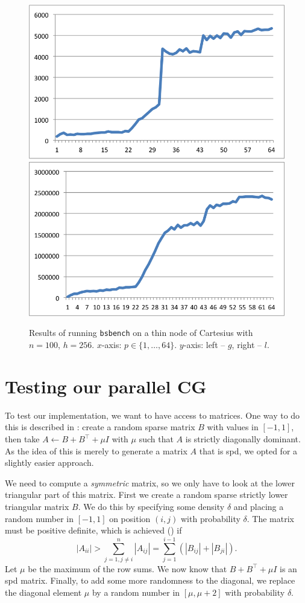 \documentclass[11pt]{amsart}
\theoremstyle{definition}
\begin{document}
\begin{figure}
  \includegraphics[width=0.49\linewidth]{cartg.png}
  \includegraphics[width=0.49\linewidth]{cartl.png}
  \caption{Results of running \texttt{bsbench} on a thin node of Cartesius with $n=100$, $h=256$. $x$-axis: $p \in \{1, \ldots, 64\}$. $y$-axis: left -- $g$, right -- $l$.}
  \label{fig:cart}
\end{figure}

\section{Testing our parallel CG}
To test our implementation, we want to have access to matrices. One way to do this is described in \cite[Ex.~4.6]{biss04}: create a random sparse matrix $B$ with values in $[-1,1]$, then take $A \gets B + B^\top + \mu I$ with $\mu$ such that $A$ is strictly diagonally dominant. As the idea of this is merely to generate a matrix $A$ that is spd, we opted for a slightly easier approach. 

We need to compute a \emph{symmetric} matrix, so we only have to look at the lower triangular part of this matrix. First we create a random sparse strictly lower triangular matrix $B$. We do this by specifying some density $\delta$ and placing a random number in $[-1,1]$ on position $(i,j)$ with probability $\delta$. The matrix must be positive definite, which is achieved (\cite[Ex.~24.2]{trefbau}) if
\[
  |A_{ii}| > \sum_{j=1, j\ne i}^n |A_{ij}|= \sum_{j=1}^{i-1} (|B_{ij}| + |B_{ji}|).
\]
Let $\mu$ be the maximum of the row sums. We now know that $B + B^\top + \mu I$ is an spd matrix. Finally, to add some more randomness to the diagonal, we replace the diagonal element $\mu$ by a random number in $[\mu, \mu + 2]$ with probability $\delta$.
\end{document}

